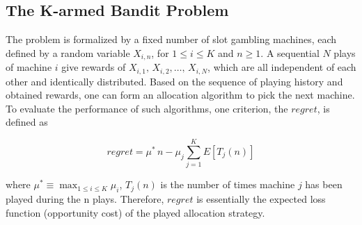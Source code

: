 \documentclass[conference]{IEEEtran}
\begin{document}
\subsection{The K-armed Bandit Problem}
The problem is formalized by a fixed number of slot gambling machines, each defined by a random variable $X_{i,n}$, for $1\leq i \leq K$ and $n \geq 1$. A sequential $N$ plays of machine $i$ give rewards of $X_{i,1},\,X_{i,2},\dots,\, X_{i,N}$, which are all independent of each other and identically distributed. Based on the sequence of playing history and obtained rewards, one can form an allocation algorithm to pick the next machine. To evaluate the performance of such algorithms, one criterion, the $regret$, is defined as

\begin{equation*}
	regret = \mu^{*}\,n - \mu_j \sum_{j=1}^K E[T_j(n)]
\end{equation*}

where $\mu^{*} \equiv \max_{1\leq i \leq K} \mu_i$, $T_j(n)$ is the number of times machine $j$ has been played during the n plays. Therefore, $regret$ is essentially the expected loss function (opportunity cost) of the played allocation strategy.
%
%
%
%
%


\end{document}
